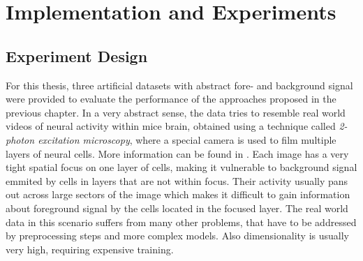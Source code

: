 \documentclass[12pt]{report}
\theoremstyle{definition}
\begin{document}
\chapter{Implementation and Experiments}
\section{Experiment Design}
For this thesis, three artificial datasets with abstract fore- and background signal were provided to evaluate the performance of the approaches proposed in the previous chapter. In a very abstract sense, the data tries to resemble real world videos of neural activity within mice brain, obtained using a technique called \emph{2-photon excitation microscopy}, where a special camera is used to film multiple layers of neural cells. More information can be found in \cite{phot}. Each image has a very tight spatial focus on one layer of cells, making it vulnerable to background signal emmited by cells in layers that are not within focus. Their activity usually pans out across large sectors of the image which  makes it difficult to gain information about foreground signal by the cells located in the focused layer. The real world data in this scenario suffers from many other problems, that have to be addressed by preprocessing steps and more complex models. Also dimensionality is usually very high, requiring expensive training.
\end{document}
